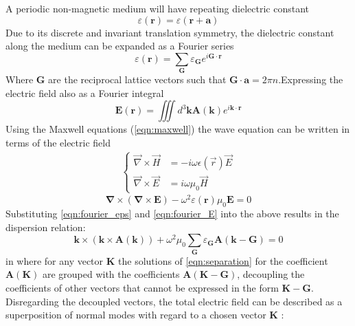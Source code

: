 A periodic non-magnetic medium will have repeating dielectric constant\cite{Yariv}
\begin{equation}
	\varepsilon(\boldsymbol{r}) = \varepsilon(\boldsymbol{r}+\boldsymbol{a})  
\end{equation}
Due to its discrete and invariant translation symmetry, the dielectric constant along the medium can be expanded as a Fourier series
\begin{equation}
	\varepsilon(\boldsymbol{r}) = \sum_{\boldsymbol{G}}\varepsilon_{\boldsymbol{G}}e^{i\boldsymbol{G}\cdot\boldsymbol{r}}  
	\label{eqn:fourier_eps}
\end{equation}
Where $\boldsymbol{G}$ are the reciprocal lattice vectors such that $\boldsymbol{G}\cdot\boldsymbol{a} = 2\pi n$.Expressing the electric field also as a Fourier integral
\begin{equation}
	\boldsymbol{E}(\boldsymbol{r}) = \iiint d^3\boldsymbol{k}\boldsymbol{A}(\boldsymbol{k})e^{i\boldsymbol{k}\cdot\boldsymbol{r}}
	\label{eqn:fourier_E}
\end{equation}
 Using the Maxwell equations (\ref{eqn:maxwell}) the wave equation can be written in terms of the electric field 
 \begin{equation}
 	\begin{aligned}
 	\begin{cases}
 			\vec{\nabla}\times\vec{H} &= -i\omega\epsilon(\vec{r})\vec{E}\\
			\vec{\nabla}\times\vec{E} &= i\omega\mu_0\vec{H}	
 	\end{cases}
 	\end{aligned}
 	\label{eqn:maxwell}
 \end{equation}
\begin{equation}
	\boldsymbol{\nabla}\times(\boldsymbol{\nabla}\times\boldsymbol{E})-\omega^2\varepsilon(\boldsymbol{r})\mu_0\boldsymbol{E} = 0
\end{equation}
Substituting \eqref{eqn:fourier_eps} and \eqref{eqn:fourier_E} into the above results in the dispersion relation:
\begin{equation}
	\boldsymbol{k}\times(\boldsymbol{k}\times\boldsymbol{A}(\boldsymbol{k})) + \omega^2\mu_0\sum_{\boldsymbol{G}}\varepsilon_{\boldsymbol{G}}\boldsymbol{A}(\boldsymbol{k}-\boldsymbol{G}) = 0
	\label{eqn:separation}
\end{equation}
in where for any vector $\boldsymbol{K}$ the solutions of \eqref{eqn:separation} for the coefficient $\boldsymbol{A}(\boldsymbol{K})$ are grouped with the coefficients $\boldsymbol{A}(\boldsymbol{K}-\boldsymbol{G})$, decoupling the coefficients of other vectors that cannot be expressed in the form $\boldsymbol{K}-\boldsymbol{G}$. Disregarding the decoupled vectors, the total electric field can be described as a superposition of normal modes with regard to a chosen vector $\boldsymbol{K}$ :
